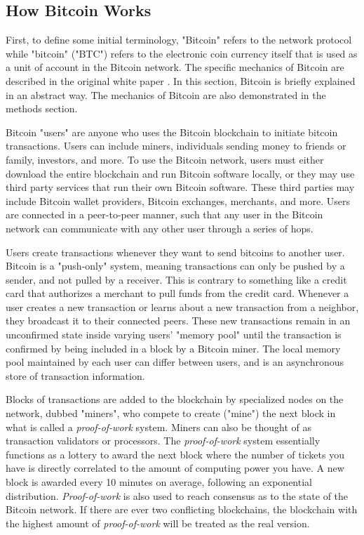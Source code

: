\documentclass[12pt]{report}
\begin{document}


\subsection{How Bitcoin Works}
\label{sec:how}
First, to define some initial terminology, "Bitcoin" refers to the network protocol while "bitcoin" ("BTC") refers to the electronic coin currency itself that is used as a unit of account in the Bitcoin network. The specific mechanics of Bitcoin are described in the original white paper \cite{Nakamoto.2008}. In this section, Bitcoin is briefly explained in an abstract way. The mechanics of Bitcoin are also demonstrated in the methods section.

Bitcoin "users" are anyone who uses the Bitcoin blockchain to initiate bitcoin transactions. Users can include miners, individuals sending money to friends or family, investors, and more. To use the Bitcoin network, users must either download the entire blockchain and run Bitcoin software locally, or they may use third party services that run their own Bitcoin software. These third parties may include Bitcoin wallet providers, Bitcoin exchanges, merchants, and more. Users are connected in a peer-to-peer manner, such that any user in the Bitcoin network can communicate with any other user through a series of hops.

Users create transactions whenever they want to send bitcoins to another user. Bitcoin is a "push-only" system, meaning transactions can only be pushed by a sender, and not pulled by a receiver. This is contrary to something like a credit card that authorizes a merchant to pull funds from the credit card. Whenever a user creates a new transaction or learns about a new transaction from a neighbor, they broadcast it to their connected peers. These new transactions remain in an unconfirmed state inside varying users' "memory pool" until the transaction is confirmed by being included in a block by a Bitcoin miner. The local memory pool maintained by each user can differ between users, and is an asynchronous store of transaction information. 

Blocks of transactions are added to the blockchain by specialized nodes on the network, dubbed "miners", who compete to create ("mine") the next block in what is called a \textit{proof-of-work} system. Miners can also be thought of as transaction validators or processors. The \textit{proof-of-work} system essentially functions as a lottery to award the next block where the number of tickets you have is directly correlated to the amount of computing power you have. A new block is awarded every 10 minutes on average, following an exponential distribution. \textit{Proof-of-work} is also used to reach consensus as to the state of the Bitcoin network. If there are ever two conflicting blockchains, the blockchain with the highest amount of \textit{proof-of-work} will be treated as the real version.
\end{document}
